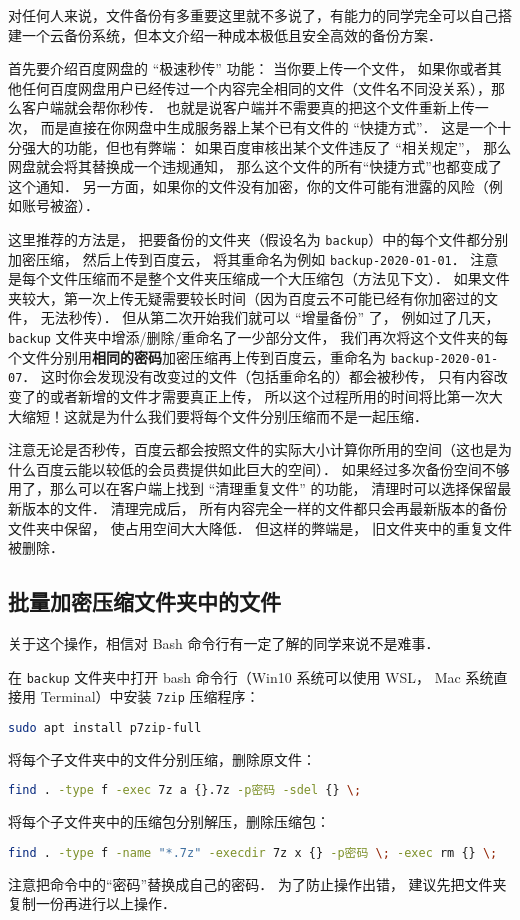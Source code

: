 
对任何人来说，文件备份有多重要这里就不多说了，有能力的同学完全可以自己搭建一个云备份系统，但本文介绍一种成本极低且安全高效的备份方案．

首先要介绍百度网盘的 “极速秒传” 功能： 当你要上传一个文件， 如果你或者其他任何百度网盘用户已经传过一个内容完全相同的文件（文件名不同没关系），那么客户端就会帮你秒传． 也就是说客户端并不需要真的把这个文件重新上传一次， 而是直接在你网盘中生成服务器上某个已有文件的 “快捷方式”． 这是一个十分强大的功能，但也有弊端： 如果百度审核出某个文件违反了 “相关规定”， 那么网盘就会将其替换成一个违规通知， 那么这个文件的所有“快捷方式”也都变成了这个通知． 另一方面，如果你的文件没有加密，你的文件可能有泄露的风险（例如账号被盗）．

这里推荐的方法是， 把要备份的文件夹（假设名为 \verb|backup|）中的每个文件都分别加密压缩， 然后上传到百度云， 将其重命名为例如 \verb|backup-2020-01-01|． 注意是每个文件压缩而不是整个文件夹压缩成一个大压缩包（方法见下文）． 如果文件夹较大，第一次上传无疑需要较长时间（因为百度云不可能已经有你加密过的文件， 无法秒传）． 但从第二次开始我们就可以 “增量备份” 了， 例如过了几天， \verb|backup| 文件夹中增添/删除/重命名了一少部分文件， 我们再次将这个文件夹的每个文件分别用\textbf{相同的密码}加密压缩再上传到百度云，重命名为 \verb|backup-2020-01-07|． 这时你会发现没有改变过的文件（包括重命名的）都会被秒传， 只有内容改变了的或者新增的文件才需要真正上传， 所以这个过程所用的时间将比第一次大大缩短！这就是为什么我们要将每个文件分别压缩而不是一起压缩．

注意无论是否秒传，百度云都会按照文件的实际大小计算你所用的空间（这也是为什么百度云能以较低的会员费提供如此巨大的空间）． 如果经过多次备份空间不够用了，那么可以在客户端上找到 “清理重复文件” 的功能， 清理时可以选择保留最新版本的文件． 清理完成后， 所有内容完全一样的文件都只会再最新版本的备份文件夹中保留， 使占用空间大大降低． 但这样的弊端是， 旧文件夹中的重复文件被删除．

\subsection{批量加密压缩文件夹中的文件}

关于这个操作，相信对 Bash 命令行有一定了解的同学来说不是难事．

在 \verb|backup| 文件夹中打开 bash 命令行（Win10 系统可以使用 WSL， Mac 系统直接用 Terminal）中安装 \verb|7zip| 压缩程序：
\begin{lstlisting}[language=bash]
sudo apt install p7zip-full
\end{lstlisting}
将每个子文件夹中的文件分别压缩，删除原文件：
\begin{lstlisting}[language=bash]
find . -type f -exec 7z a {}.7z -p密码 -sdel {} \;
\end{lstlisting}
将每个子文件夹中的压缩包分别解压，删除压缩包：
\begin{lstlisting}[language=bash]
find . -type f -name "*.7z" -execdir 7z x {} -p密码 \; -exec rm {} \;
\end{lstlisting}
注意把命令中的“密码”替换成自己的密码． 为了防止操作出错， 建议先把文件夹复制一份再进行以上操作．
